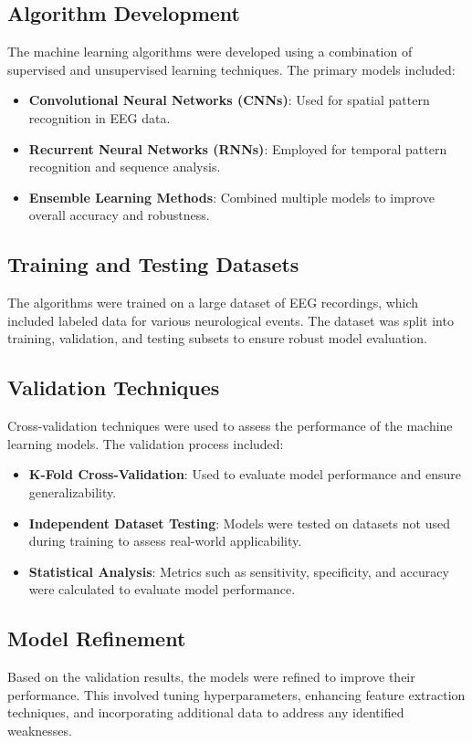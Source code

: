 \documentclass[12pt,journal,compsoc]{IEEEtran}
\begin{document}
\subsection{Algorithm Development}
The machine learning algorithms were developed using a combination of supervised and unsupervised learning techniques. The primary models included:
\begin{itemize}
    \item \textbf{Convolutional Neural Networks (CNNs)}: Used for spatial pattern recognition in EEG data.
    \item \textbf{Recurrent Neural Networks (RNNs)}: Employed for temporal pattern recognition and sequence analysis.
    \item \textbf{Ensemble Learning Methods}: Combined multiple models to improve overall accuracy and robustness.
\end{itemize}

\subsection{Training and Testing Datasets}
The algorithms were trained on a large dataset of EEG recordings, which included labeled data for various neurological events. The dataset was split into training, validation, and testing subsets to ensure robust model evaluation.

\subsection{Validation Techniques}
Cross-validation techniques were used to assess the performance of the machine learning models. The validation process included:
\begin{itemize}
    \item \textbf{K-Fold Cross-Validation}: Used to evaluate model performance and ensure generalizability.
    \item \textbf{Independent Dataset Testing}: Models were tested on datasets not used during training to assess real-world applicability.
    \item \textbf{Statistical Analysis}: Metrics such as sensitivity, specificity, and accuracy were calculated to evaluate model performance.
\end{itemize}

\subsection{Model Refinement}
Based on the validation results, the models were refined to improve their performance. This involved tuning hyperparameters, enhancing feature extraction techniques, and incorporating additional data to address any identified weaknesses.
\end{document}
